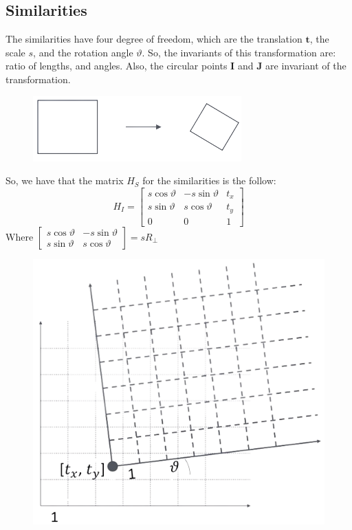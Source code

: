 \documentclass[12pt, a4paper]{report}
\begin{document}
    \subsection{Similarities}
    The similarities have four degree of freedom, which are the translation $\boldsymbol{t}$, the scale $s$, and the rotation angle $\vartheta$. So, the invariants of this transformation are: ratio of lengths, and angles.
    Also, the circular points $\boldsymbol{I}$ and $\boldsymbol{J}$ are invariant of the transformation. 
    \begin{figure}[H]
        \centering
        \includegraphics[width=0.5\linewidth]{images/similarity.png}
    \end{figure}
    So, we have that the matrix $H_S$ for the similarities is the follow: 
    \[H_I=
    \begin{bmatrix}
        s\cos \vartheta & -s\sin \vartheta & t_x \\
        s\sin \vartheta & s\cos \vartheta & t_y \\
        0 & 0 & 1
    \end{bmatrix}\]
    Where $
    \begin{bmatrix}
        s\cos \vartheta & -s\sin \vartheta \\
        s\sin \vartheta & s\cos \vartheta
    \end{bmatrix}
    =sR_{\perp}$
    \begin{figure}[H]
        \centering
        \includegraphics[width=0.5\linewidth]{images/isometry1.png}
    \end{figure}
\end{document}
